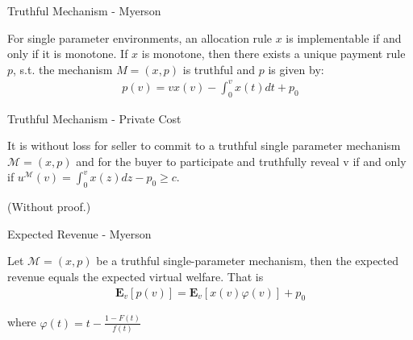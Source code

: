 \documentclass{beamer}
\begin{document}
\begin{frame}{Truthful Mechanism - Myerson}
  \begin{lemma}
    For single parameter environments, an allocation rule $x$ is implementable if and only if it is monotone.
    If $x$ is monotone, then there exists a unique payment rule $p$, s.t. the mechanism $M=(x,p)$ is truthful
    and $p$ is given by:
    \begin{align*}
      p(v) = v x(v) - \int_0^v x(t) dt + p_0
    \end{align*}
  \end{lemma}
\end{frame}

\begin{frame}{Truthful Mechanism - Private Cost}
  \begin{lemma}
    It is without loss for seller to commit to a truthful single parameter mechanism $\mathcal{M}=(x,p)$ and
    for the buyer to participate and truthfully reveal v if and only if $u^\mathcal{M}(v) = \int_0^v x(z)dz - p_0 \geq c$.
  \end{lemma}
  (Without proof.)
\end{frame}

\begin{frame}{Expected Revenue - Myerson}
  \begin{lemma}
    Let $\mathcal{M}=(x,p)$ be a truthful single-parameter mechanism, then the expected revenue equals the expected virtual welfare. That is
    \begin{align*}
      \mathbf{E}_v\left[p(v)\right]
      = \mathbf{E}_v\left[x(v)\varphi(v)\right] + p_0
    \end{align*}

    where $\varphi(t) = t - \frac{1 - F(t)}{f(t)}$
  \end{lemma}
\end{frame}
\end{document}
